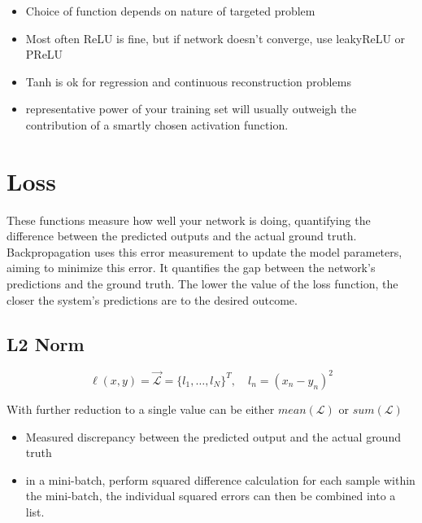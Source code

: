 \documentclass[11pt]{article}
\begin{document}
\begin{itemize}
    \item Choice of function depends on nature of targeted problem
    \item Most often ReLU is fine, but if network doesn't converge, use leakyReLU or PReLU
    \item Tanh is ok for regression and continuous reconstruction problems
    \item representative power of your training set will usually outweigh the contribution of a smartly chosen activation function.
\end{itemize}

\section{Loss}

These functions measure how well your network is doing, quantifying the difference between the predicted outputs and the actual ground truth. Backpropagation uses this error measurement to update the model parameters, aiming to minimize this error. It quantifies the gap between the network's predictions and the ground truth. The lower the value of the loss function, the closer the system's predictions are to the desired outcome.

\subsection{L2 Norm}

\begin{definition}\label{eq:L2-norm}
    \begin{equation*}
        \ell(x,y)=\vec{\mathcal{L}} = \{ l_1, \ldots, l_N\}^T, \quad l_n=(x_n - y_n)^2
    \end{equation*}

    With further reduction to a single value can be either $mean(\mathcal L)$ or $sum(\mathcal{L})$ 
\end{definition}


\begin{itemize}
    \item Measured discrepancy between the predicted output and the actual ground truth
    \item in a mini-batch, perform squared difference calculation for each sample within the mini-batch, the individual squared errors can then be combined into a list.
\end{itemize}
\end{document}
